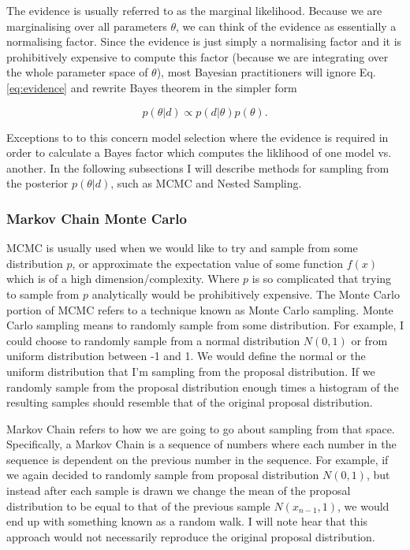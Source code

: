 The evidence is usually referred to as the marginal likelihood. Because we are marginalising over all parameters $\theta$, we can think of the evidence as essentially a normalising factor. Since the evidence is just simply a normalising factor and it is prohibitively expensive to compute this factor (because we are integrating over the whole parameter space of $\theta$), most Bayesian practitioners will ignore Eq. \ref{eq:evidence} and rewrite Bayes theorem in the simpler form 

\begin{equation}
    p(\theta | d) \propto p(d | \theta) p(\theta).
\end{equation}

%
%
Exceptions to to this concern model selection where the evidence is required 
in order to calculate a Bayes factor which computes the liklihood of 
one model vs. another. In the following subsections I will describe 
methods for sampling from the posterior $p(\theta|d)$, such as \ac{MCMC} and 
Nested Sampling.

\subsubsection{Markov Chain Monte Carlo}

%
\ac{MCMC} is usually used when we would like to try and sample from some distribution $p$, or approximate the expectation value of some function $f(x)$ which is of a high dimension/complexity. Where $p$ is so complicated that trying to sample from $p$ analytically would be prohibitively expensive. The Monte Carlo portion of \ac{MCMC} refers to a technique known as Monte Carlo sampling. Monte Carlo sampling means to randomly sample from some distribution. For example, I could choose to randomly sample from a normal distribution $N(0,1)$ or from uniform distribution between -1 and 1. We would define the normal or the uniform distribution that I'm sampling from the proposal distribution. If we randomly sample from the proposal distribution enough times a histogram of the resulting samples should resemble that of the original proposal distribution. 

%
%
Markov Chain refers to how we are going to go about sampling from that space. Specifically, a Markov Chain is a sequence of numbers where each number in the sequence is dependent on the previous number in the sequence. For example, if we again decided to randomly sample from proposal distribution $N(0,1)$, but instead after each sample is drawn we change the mean of the proposal distribution to be equal to that of the previous sample $N(x_{n-1},1)$, we would end up with something known as a random walk. I will note hear that this approach would not necessarily reproduce the original proposal distribution.

